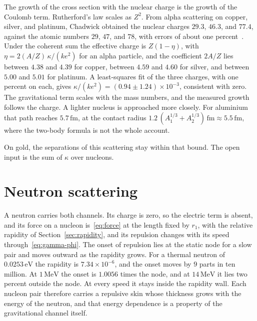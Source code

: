 \documentclass[a4paper]{article}
\begin{document}
The growth of the cross section with the nuclear charge is the growth of the Coulomb term. Rutherford's law scales as \(Z^{2}\). From alpha scattering on copper, silver, and platinum, Chadwick obtained the nuclear charges \(29.3\), \(46.3\), and \(77.4\), against the atomic numbers \(29\), \(47\), and \(78\), with errors of about one percent~\cite{chadwick1920}. Under the coherent sum the effective charge is \(Z(1-\eta)\), with \(\eta=2(A/Z)\,\kappa/(ke^{2})\) for an alpha particle, and the coefficient \(2A/Z\) lies between \(4.38\) and \(4.39\) for copper, between \(4.59\) and \(4.60\) for silver, and between \(5.00\) and \(5.01\) for platinum. A least-squares fit of the three charges, with one percent on each, gives \(\kappa/(ke^{2})=(0.94\pm 1.24)\times 10^{-3}\), consistent with zero. The gravitational term scales with the mass numbers, and the measured growth follows the charge. A lighter nucleus is approached more closely. For aluminium that path reaches \(5.7\,\mathrm{fm}\), at the contact radius \(1.2\,(A_1^{1/3}+A_2^{1/3})\,\mathrm{fm}\approx 5.5\,\mathrm{fm}\), where the two-body formula is not the whole account.

On gold, the separations of this scattering stay within that bound. The open input is the sum of \(\kappa\) over nucleons.

\section{Neutron scattering}
\label{sec:neutron}

A neutron carries both channels. Its charge is zero, so the electric term is absent, and its force on a nucleon is~\eqref{eq:force} at the length fixed by \(r_1\), with the relative rapidity of Section~\ref{sec:rapidity}, and its repulsion changes with its speed through~\eqref{eq:gamma-phi}. The onset of repulsion lies at the static node for a slow pair and moves outward as the rapidity grows. For a thermal neutron of \(0.0253\,\mathrm{eV}\) the rapidity is \(7.34\times 10^{-6}\), and the onset moves by \(9\) parts in ten million. At \(1\,\mathrm{MeV}\) the onset is \(1.0056\) times the node, and at \(14\,\mathrm{MeV}\) it lies two percent outside the node. At every speed it stays inside the rapidity wall. Each nucleon pair therefore carries a repulsive skin whose thickness grows with the energy of the neutron, and that energy dependence is a property of the gravitational channel itself.
\end{document}
